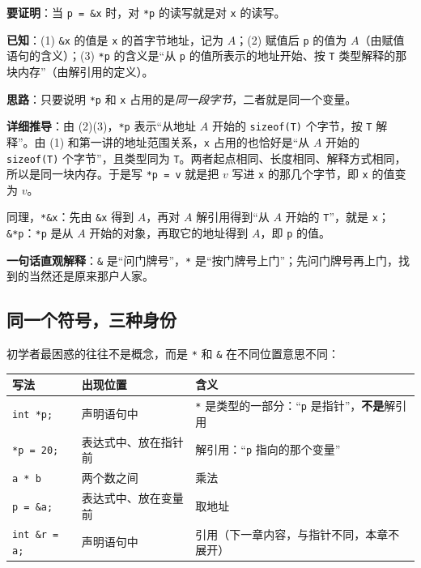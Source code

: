 \documentclass[UTF8,a4paper,11pt,fontset=none,zihao=-4]{ctexart}
\newcommand{\cc}[1]{\texttt{#1}}
\begin{document}
\begin{proofbox}
\textbf{要证明}：当 \cc{p = \&x} 时，对 \cc{*p} 的读写就是对 \cc{x} 的读写。

\textbf{已知}：(1) \cc{\&x} 的值是 \cc{x} 的首字节地址，记为 $A$；(2) 赋值后 \cc{p} 的值为 $A$（由赋值语句的含义）；(3) \cc{*p} 的含义是“从 \cc{p} 的值所表示的地址开始、按 \cc{T} 类型解释的那块内存”（由解引用的定义）。

\textbf{思路}：只要说明 \cc{*p} 和 \cc{x} 占用的是\emph{同一段字节}，二者就是同一个变量。

\textbf{详细推导}：由 (2)(3)，\cc{*p} 表示“从地址 $A$ 开始的 \cc{sizeof(T)} 个字节，按 \cc{T} 解释”。由 (1) 和第一讲的地址范围关系，\cc{x} 占用的也恰好是“从 $A$ 开始的 \cc{sizeof(T)} 个字节”，且类型同为 \cc{T}。两者起点相同、长度相同、解释方式相同，所以是同一块内存。于是写 \cc{*p = v} 就是把 $v$ 写进 \cc{x} 的那几个字节，即 \cc{x} 的值变为 $v$。

同理，\cc{*\&x}：先由 \cc{\&x} 得到 $A$，再对 $A$ 解引用得到“从 $A$ 开始的 \cc{T}”，就是 \cc{x}；\cc{\&*p}：\cc{*p} 是从 $A$ 开始的对象，再取它的地址得到 $A$，即 \cc{p} 的值。

\textbf{一句话直观解释}：\cc{\&} 是“问门牌号”，\cc{*} 是“按门牌号上门”；先问门牌号再上门，找到的当然还是原来那户人家。
\end{proofbox}

\subsection{同一个符号，三种身份}
初学者最困惑的往往不是概念，而是 \cc{*} 和 \cc{\&} 在不同位置意思不同：

\begin{center}
\noindent\begin{tabularx}{\linewidth}{@{}p{3.2cm}p{3.3cm}Y@{}}
\toprule
{}写法 & 出现位置 & 含义 \\
\midrule
\cc{int *p;} & 声明语句中 & \cc{*} 是类型的一部分：“\cc{p} 是指针”，\textbf{不是}解引用 \\
\cc{*p = 20;} & 表达式中、放在指针前 & 解引用：“\cc{p} 指向的那个变量” \\
\cc{a * b} & 两个数之间 & 乘法 \\
\cc{p = \&a;} & 表达式中、放在变量前 & 取地址 \\
\cc{int \&r = a;} & 声明语句中 & 引用（下一章内容，与指针不同，本章不展开） \\
\bottomrule
\end{tabularx}
\end{center}
\end{document}
